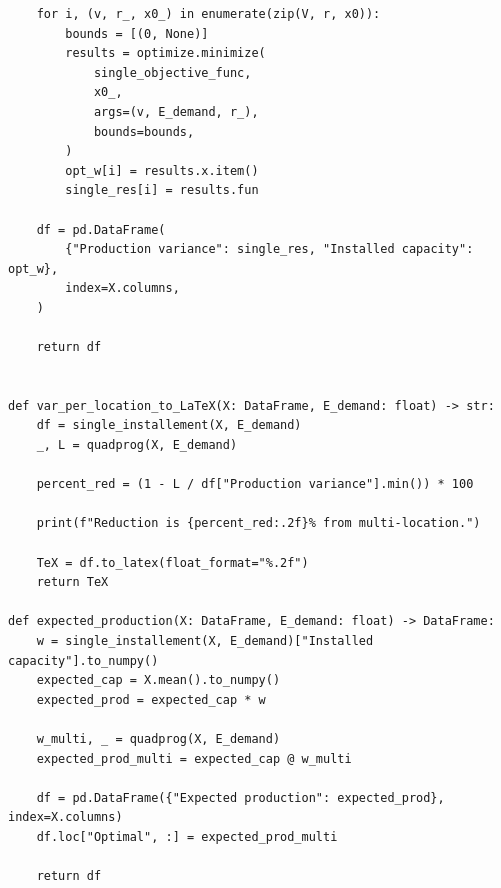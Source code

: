 \documentclass{article}
\begin{document}
\begin{verbatim}
    for i, (v, r_, x0_) in enumerate(zip(V, r, x0)):
        bounds = [(0, None)]
        results = optimize.minimize(
            single_objective_func,
            x0_,
            args=(v, E_demand, r_),
            bounds=bounds,
        )
        opt_w[i] = results.x.item()
        single_res[i] = results.fun

    df = pd.DataFrame(
        {"Production variance": single_res, "Installed capacity": opt_w},
        index=X.columns,
    )

    return df


def var_per_location_to_LaTeX(X: DataFrame, E_demand: float) -> str:
    df = single_installement(X, E_demand)
    _, L = quadprog(X, E_demand)

    percent_red = (1 - L / df["Production variance"].min()) * 100

    print(f"Reduction is {percent_red:.2f}% from multi-location.")

    TeX = df.to_latex(float_format="%.2f")
    return TeX

def expected_production(X: DataFrame, E_demand: float) -> DataFrame:
    w = single_installement(X, E_demand)["Installed capacity"].to_numpy()
    expected_cap = X.mean().to_numpy()
    expected_prod = expected_cap * w

    w_multi, _ = quadprog(X, E_demand)
    expected_prod_multi = expected_cap @ w_multi

    df = pd.DataFrame({"Expected production": expected_prod}, index=X.columns)
    df.loc["Optimal", :] = expected_prod_multi

    return df
\end{verbatim}
\end{document}
